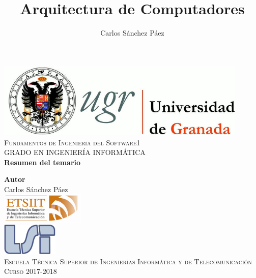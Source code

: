 \documentclass[12pt,spanish]{article}
\title{Arquitectura de Computadores}
\author{Carlos Sánchez Páez}
\begin{document}
\begin{titlepage}

\newlength{\centeroffset}
\setlength{\centeroffset}{-0.5\oddsidemargin}
\addtolength{\centeroffset}{0.5\evensidemargin}
\thispagestyle{empty}

\noindent\hspace*{\centeroffset}
\begin{minipage}{\textwidth}

\centering
\includegraphics[width=0.9\textwidth]{logo_ugr.jpg}\\[1.4cm]

\textsc{ \Large Fundamentos de Ingeniería del Software1\\[0.2cm]}
\textsc{GRADO EN INGENIERÍA INFORMÁTICA}\\[1cm]

{\Huge\bfseries Resumen del temario\\}
\end{minipage}

\vspace{1.5cm}
\noindent\hspace*{\centeroffset}
\begin{minipage}{\textwidth}
\centering

\textbf{Autor}\\ {Carlos Sánchez Páez}\\[2.5ex]
\includegraphics[width=0.3\textwidth]{etsiit_logo.png}\\[0.1cm]
\vspace{1.5cm}
\includegraphics[width=0.2\textwidth]{lsi.png}\\[0.1cm]
\vspace{1cm}
\textsc{Escuela Técnica Superior de Ingenierías Informática y de Telecomunicación}\\
\vspace{1cm}
\textsc{Curso 2017-2018}
\end{minipage}
\end{titlepage}
\thispagestyle{empty}
\newpage
\tableofcontents{}
\listoffigures
\thispagestyle{empty}
\newpage
\end{document}
